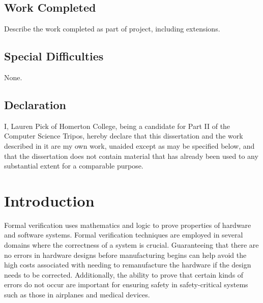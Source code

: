 \documentclass[12pt,a4paper,twoside,openright]{report}
\begin{document}
\section*{Work Completed}

Describe the work completed as part of project, including extensions.

\section*{Special Difficulties}

None.
 
\newpage
\section*{Declaration}

I, Lauren Pick of Homerton College, being a candidate for Part II of the Computer
Science Tripos, hereby declare
that this dissertation and the work described in it are my own work,
unaided except as may be specified below, and that the dissertation
does not contain material that has already been used to any substantial
extent for a comparable purpose.

\bigskip
{}

\medskip
{}

\tableofcontents





\pagestyle{headings}

\chapter{Introduction}


Formal verification uses mathematics and logic to prove properties of
hardware and software systems. Formal verification techniques are
employed in several domains where the correctness of a system is
crucial. Guaranteeing that there are no errors in hardware designs before
manufacturing begins can help avoid the high costs associated with needing to
remanufacture the hardware if the design needs to be corrected.
Additionally, the ability to prove that certain kinds of errors do not
occur are important for ensuring safety in safety-critical systems such
as those in airplanes and medical devices.
\end{document}

